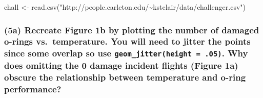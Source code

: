 \documentclass[
]{article}
\newenvironment{Shaded}{\begin{snugshade}}{\end{snugshade}}
\newcommand{\FunctionTok}[1]{\textcolor[rgb]{0.00,0.00,0.00}{#1}}
\newcommand{\NormalTok}[1]{#1}
\newcommand{\OtherTok}[1]{\textcolor[rgb]{0.56,0.35,0.01}{#1}}
\newcommand{\StringTok}[1]{\textcolor[rgb]{0.31,0.60,0.02}{#1}}
\begin{document}
\begin{Shaded}
\begin{Highlighting}[]
\NormalTok{chall }\OtherTok{\textless{}{-}} \FunctionTok{read.csv}\NormalTok{(}\StringTok{"http://people.carleton.edu/\textasciitilde{}kstclair/data/challenger.csv"}\NormalTok{)}
\end{Highlighting}
\end{Shaded}

\hypertarget{a-recreate-figure-1b-by-plotting-the-number-of-damaged-o-rings-vs.-temperature.-you-will-need-to-jitter-the-points-since-some-overlap-so-use-geom_jitterheight-.05.-why-does-omitting-the-0-damage-incident-flights-figure-1a-obscure-the-relationship-between-temperature-and-o-ring-performance}{%
\subsubsection{\texorpdfstring{(5a) Recreate Figure 1b by plotting the
number of damaged o-rings vs.~temperature. You will need to jitter the
points since some overlap so use \texttt{geom\_jitter(height\ =\ .05)}.
Why does omitting the 0 damage incident flights (Figure 1a) obscure the
relationship between temperature and o-ring
performance?}{(5a) Recreate Figure 1b by plotting the number of damaged o-rings vs.~temperature. You will need to jitter the points since some overlap so use geom\_jitter(height = .05). Why does omitting the 0 damage incident flights (Figure 1a) obscure the relationship between temperature and o-ring performance?}}\label{a-recreate-figure-1b-by-plotting-the-number-of-damaged-o-rings-vs.-temperature.-you-will-need-to-jitter-the-points-since-some-overlap-so-use-geom_jitterheight-.05.-why-does-omitting-the-0-damage-incident-flights-figure-1a-obscure-the-relationship-between-temperature-and-o-ring-performance}}
\end{document}
